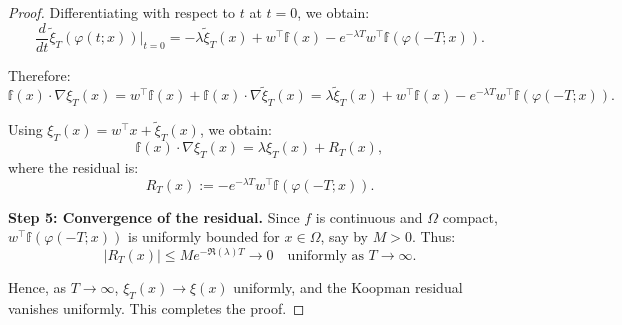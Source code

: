 \documentclass[10pt,a4paper]{amsart}
\begin{document}
\begin{proof}
Differentiating with respect to \( t \) at \( t = 0 \), we obtain:
\[
\frac{d}{dt} \tilde{\xi}_T(\varphi(t; x)) \bigg|_{t = 0}
= -\lambda \tilde{\xi}_T(x) + w^\top {\mathbb f}(x) - e^{-\lambda T} w^\top {\mathbb f}(\varphi(-T; x)).
\]

Therefore:
\[
{\mathbb f}(x) \cdot \nabla \xi_T(x) = w^\top {\mathbb f}(x) + {\mathbb f}(x) \cdot \nabla \tilde{\xi}_T(x)
= \lambda \tilde{\xi}_T(x) + w^\top {\mathbb f}(x) - e^{-\lambda T} w^\top {\mathbb f}(\varphi(-T; x)).
\]

Using \( \xi_T(x) = w^\top x + \tilde{\xi}_T(x) \), we obtain:
\[
{\mathbb f}(x) \cdot \nabla \xi_T(x) = \lambda \xi_T(x) + R_T(x),
\]
where the residual is:
\[
R_T(x) := -e^{-\lambda T} w^\top {\mathbb f}(\varphi(-T; x)).
\]

\medskip

\textbf{Step 5: Convergence of the residual.}  
Since \( f \) is continuous and \( \Omega \) compact, \( w^\top {\mathbb f}(\varphi(-T; x)) \) is uniformly bounded for \( x \in \Omega \), say by \( M > 0 \). Thus:
\[
|R_T(x)| \le M e^{-\Re(\lambda) T} \to 0 \quad \text{uniformly as } T \to \infty.
\]

Hence, as \( T \to \infty \), \( \xi_T(x) \to \xi(x) \) uniformly, and the Koopman residual vanishes uniformly. This completes the proof.
\end{proof}
\end{document}
